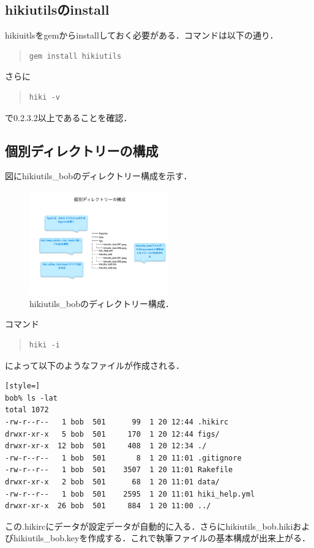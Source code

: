 \subsection{hikiutilsのinstall}
hikiuitlsをgemからinstallしておく必要がある．コマンドは以下の通り．
\begin{quote}\begin{verbatim}
gem install hikiutils
\end{verbatim}\end{quote}
さらに
\begin{quote}\begin{verbatim}
hiki -v
\end{verbatim}\end{quote}
で0.2.3.2以上であることを確認．

\subsection{個別ディレクトリーの構成}
図にhikiutils\_bobのディレクトリー構成を示す．

\begin{figure}[htbp]\begin{center}
\includegraphics[width=6cm,bb=0 0 442 500]{../figs/./hikiutils_bob.003.jpeg}
\caption{hikiutils\_bobのディレクトリー構成．}
\label{default}\end{center}\end{figure}
コマンド
\begin{quote}\begin{verbatim}
hiki -i
\end{verbatim}\end{quote}
によって以下のようなファイルが作成される．
\begin{lstlisting}[style=]
bob% ls -lat
total 1072
-rw-r--r--   1 bob  501      99  1 20 12:44 .hikirc
drwxr-xr-x   5 bob  501     170  1 20 12:44 figs/
drwxr-xr-x  12 bob  501     408  1 20 12:34 ./
-rw-r--r--   1 bob  501       8  1 20 11:01 .gitignore
-rw-r--r--   1 bob  501    3507  1 20 11:01 Rakefile
drwxr-xr-x   2 bob  501      68  1 20 11:01 data/
-rw-r--r--   1 bob  501    2595  1 20 11:01 hiki_help.yml
drwxr-xr-x  26 bob  501     884  1 20 11:00 ../
\end{lstlisting}
この.hikircにデータが設定データが自動的に入る．さらにhikiutils\_bob.hikiおよびhikiutils\_bob.keyを作成する．これで執筆ファイルの基本構成が出来上がる．

